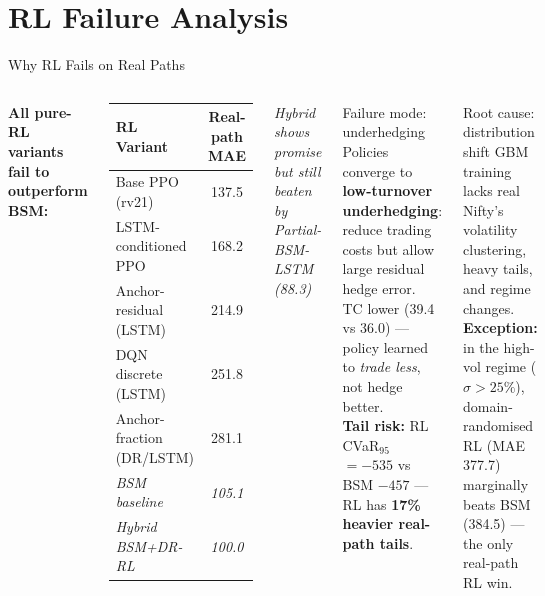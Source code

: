 \documentclass[aspectratio=169,10pt]{beamer}
\begin{document}
\section{RL Failure Analysis}

\begin{frame}{Why RL Fails on Real Paths}
\begin{columns}[T]
\textbf{All pure-RL variants fail to outperform BSM:}

\begin{center}
\small
\begin{tabular}{lc}
\toprule
RL Variant & Real-path MAE \\
\midrule
Base PPO (rv21)            & 137.5 \\
LSTM-conditioned PPO       & 168.2 \\
Anchor-residual (LSTM)     & 214.9 \\
DQN discrete (LSTM)        & 251.8 \\
Anchor-fraction (DR/LSTM)  & 281.1 \\
\midrule
\textit{BSM baseline}      & \textit{105.1} \\
\textit{Hybrid BSM+DR-RL}  & \textit{100.0} \\
\bottomrule
\end{tabular}
\end{center}
\vspace{-2pt}
{\footnotesize\textit{Hybrid shows promise but still beaten by Partial-BSM-LSTM (88.3)}}

\begin{alertblock}{Failure mode: underhedging}
Policies converge to \textbf{low-turnover underhedging}: reduce trading costs but allow large residual hedge error.\\[0.2em]
TC lower (39.4 vs 36.0) — policy learned to \emph{trade less}, not hedge better.\\[0.2em]
\textbf{Tail risk:} RL CVaR$_{95}$ $= -535$ vs BSM $-457$ — RL has \textbf{17\% heavier real-path tails}.
\end{alertblock}
\begin{block}{Root cause: distribution shift}
GBM training lacks real Nifty's volatility clustering, heavy tails, and regime changes.\\[0.2em]
\textbf{Exception:} in the high-vol regime ($\sigma\!>\!25\%$), domain-randomised RL (MAE 377.7) marginally beats BSM (384.5) — the only real-path RL win.
\end{block}
\end{columns}
\end{frame}
\end{document}
